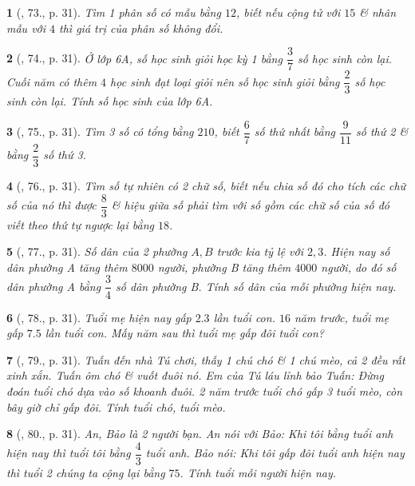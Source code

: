 \documentclass{article}
\newtheorem{baitoan}{}
\begin{document}
\begin{baitoan}[\cite{Binh_Toan_6_tap_2}, 73., p. 31]
	Tìm 1 phân số có mẫu bằng $12$, biết nếu cộng tử với $15$ \& nhân mẫu với $4$ thì giá trị của phân số không đổi.
\end{baitoan}

\begin{baitoan}[\cite{Binh_Toan_6_tap_2}, 74., p. 31]
	Ở lớp 6A, số học sinh giỏi học kỳ 1 bằng $\dfrac{3}{7}$ số học sinh còn lại. Cuối năm có thêm $4$ học sinh đạt loại giỏi nên số học sinh giỏi bằng $\dfrac{2}{3}$ số học sinh còn lại. Tính số học sinh của lớp 6A.
\end{baitoan}

\begin{baitoan}[\cite{Binh_Toan_6_tap_2}, 75., p. 31]
	Tìm 3 số có tổng bằng $210$, biết $\dfrac{6}{7}$ số thứ nhất bằng $\dfrac{9}{11}$ số thứ 2 \& bằng $\dfrac{2}{3}$ số thứ 3.
\end{baitoan}

\begin{baitoan}[\cite{Binh_Toan_6_tap_2}, 76., p. 31]
	Tìm số tự nhiên có 2 chữ số, biết nếu chia số đó cho tích các chữ số của nó thì được $\dfrac{8}{3}$ \& hiệu giữa số phải tìm với số gồm các chữ số của số đó viết theo thứ tự ngược lại bằng $18$.
\end{baitoan}

\begin{baitoan}[\cite{Binh_Toan_6_tap_2}, 77., p. 31]
	Số dân của 2 phường $A,B$ trước kia tỷ lệ với $2,3$. Hiện nay số dân phường A tăng thêm $8000$ người, phường B tăng thêm $4000$ người, do đó số dân phường A bằng $\dfrac{3}{4}$ số dân phường B. Tính số dân của mỗi phường hiện nay.
\end{baitoan}

\begin{baitoan}[\cite{Binh_Toan_6_tap_2}, 78., p. 31]
	Tuổi mẹ hiện nay gấp $2.3$ lần tuổi con. $16$ năm trước, tuổi mẹ gấp $7.5$ lần tuổi con. Mấy năm sau thì tuổi mẹ gấp đôi tuổi con?
\end{baitoan}

\begin{baitoan}[\cite{Binh_Toan_6_tap_2}, 79., p. 31]
	Tuấn đến nhà Tú chơi, thấy 1 chú chó \& 1 chú mèo, cả 2 đều rất xinh xắn. Tuấn ôm chó \& vuốt đuôi nó. Em của Tú láu lỉnh bảo Tuấn: Đừng đoán tuổi chó dựa vào số khoanh đuôi. 2 năm trước tuổi chó gấp 3 tuổi mèo, còn bây giờ chỉ gấp đôi. Tính tuổi chó, tuổi mèo.
\end{baitoan}

\begin{baitoan}[\cite{Binh_Toan_6_tap_2}, 80., p. 31]
	An, Bảo là 2 người bạn. An nói với Bảo: Khi tôi bằng tuổi anh hiện nay thì tuổi tôi bằng $\dfrac{4}{3}$ tuổi anh. Bảo nói: Khi tôi gấp đôi tuổi anh hiện nay thì tuổi 2 chúng ta cộng lại bằng $75$. Tính tuổi mỗi người hiện nay.
\end{baitoan}
\end{document}
